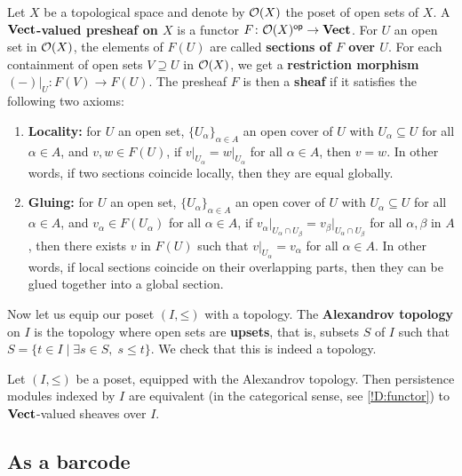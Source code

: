 \begin{definition}
\label{!D:Alexandrov}
  Let $X$ be a topological space and denote by $\mathcal{O}(X)$ the poset of open sets of $X$. A \textbf{$\operatorname{\mathbf{Vect}}$-valued presheaf on $X$} is a functor $F \colon \mathcal{O}(X)^{\mathsf{op}} \to \operatorname{\mathbf{Vect}}$. For $U$ an open set in $\mathcal{O}(X)$, the elements of $F(U)$ are called \textbf{sections of $F$ over $U$}. For each containment of open sets $V \supseteq U$ in $\mathcal{O}(X)$, we get a \textbf{restriction morphism} $(-)\big|_U \colon F(V) \to F(U)$. The presheaf $F$ is then a \textbf{sheaf} if it satisfies the following two axioms:
  \begin{enumerate}
  \item \textbf{Locality:}
    for $U$ an open set, $\{U_\alpha\}_{\alpha \in A}$ an open cover of $U$ with $U_\alpha \subseteq U$ for all $\alpha \in A$, and $v, w \in F(U)$, if $v\big|_{U_\alpha} = w\big|_{U_\alpha}$ for all $\alpha \in A$, then $v = w$. In other words, if two sections coincide locally, then they are equal globally.
  \item \textbf{Gluing:}
    for $U$ an open set, $\{U_\alpha\}_{\alpha \in A}$ an open cover of $U$ with $U_\alpha \subseteq U$ for all $\alpha \in A$, and $v_\alpha \in F(U_\alpha)$ for all $\alpha \in A$, if $v_\alpha\big|_{U_\alpha \cap U_\beta} = v_\beta\big|_{U_\alpha \cap U_\beta}$ for all $\alpha, \beta$ in $A$, then there exists $v$ in $F(U)$ such that $v\big|_{U_\alpha} = v_\alpha$ for all $\alpha \in A$. In other words, if local sections coincide on their overlapping parts, then they can be glued together into a global section.
  \end{enumerate}
  Now let us equip our poset $(I, \mathord{\leq})$ with a topology. The \textbf{Alexandrov topology} on $I$ is the topology where open sets are \textbf{upsets}, that is, subsets $S$ of $I$ such that $S = \{t \in I \mid \exists s \in S, \; s \leq t\}$. We check that this is indeed a topology.
\end{definition}

\begin{proposition}
  Let $(I, \mathord{\leq})$ be a poset, equipped with the Alexandrov topology. Then persistence modules indexed by $I$ are equivalent (in the categorical sense, see \cref{!D:functor}) to $\operatorname{\mathbf{Vect}}$-valued sheaves over $I$.
\end{proposition}

\subsection{As a barcode}

